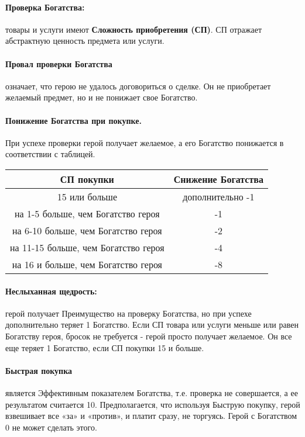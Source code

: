 \paragraph{Проверка Богатства:} товары и услуги имеют \textbf{Сложность приобретения (СП)}. СП отражает абстрактную ценность предмета или услуги.
\paragraph{Провал проверки Богатства} означает, что герою не удалось договориться о сделке. Он не приобретает желаемый предмет, но и не понижает свое Богатство.
\paragraph{Понижение Богатства при покупке.} При успехе проверки герой получает желаемое, а его Богатство понижается в соответствии с таблицей.
\begin{center}\begin{tabular}{ |c|c| }\hline
    \textbf{СП покупки} & \textbf{Снижение Богатства} \\ \hline
    15 или больше & дополнительно -1 \\ \hline
    на 1-5 больше, чем Богатство героя & -1 \\ \hline
    на 6-10 больше, чем Богатство героя & -2 \\ \hline
    на 11-15 больше, чем Богатство героя & -4 \\ \hline
    на 16 и больше, чем Богатство героя & -8 \\ \hline
\end{tabular}\end{center}
\paragraph{Неслыханная щедрость:} герой получает Преимущество на проверку Богатства, но при успехе дополнительно теряет 1 Богатство.
Если СП товара или услуги меньше или равен Богатству героя, бросок не требуется - герой просто получает желаемое. Он все еще теряет 1 Богатство, если СП покупки 15 и больше.
\paragraph{Быстрая покупка} является Эффективным показателем Богатства, т.е. проверка не совершается, а ее результатом считается 10.  Предполагается, что используя Быструю покупку, герой взвешивает все «за» и «против», и платит сразу, не торгуясь. Герой с Богатством 0 не может сделать этого.
